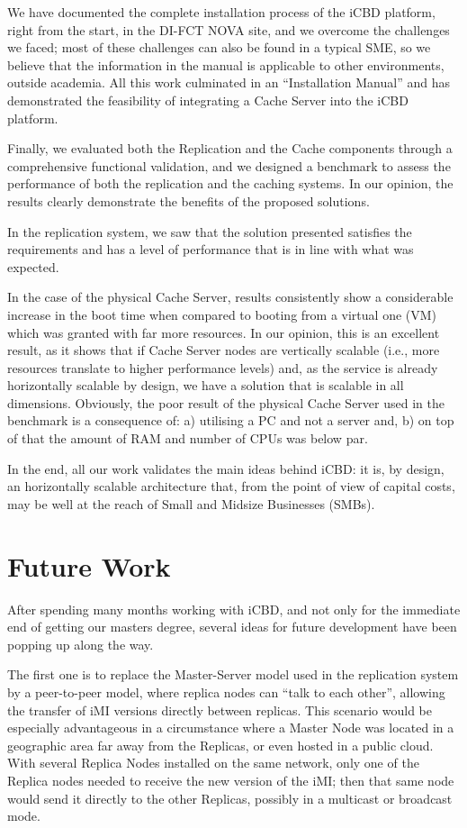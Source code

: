 We have documented the complete installation process of the iCBD platform, right from the start, in the DI-FCT NOVA site, and we overcome the challenges we faced; most of these challenges can also be found in a typical SME, so we believe that the information in the manual is applicable to other environments, outside academia. All this work culminated in an “Installation Manual” and has demonstrated the feasibility of integrating a Cache Server into the iCBD platform.

Finally, we evaluated both the Replication and the Cache components through a comprehensive functional validation, and we designed a benchmark to assess the performance of both the replication and the caching systems. In our opinion, the results clearly demonstrate the benefits of the proposed solutions.

In the replication system, we saw that the solution presented satisfies the requirements and has a level of performance that is in line with what was expected.

In the case of the physical Cache Server, results consistently show a considerable increase in the boot time when compared to booting from a virtual one (VM) which was granted with far more resources. In our opinion, this is an excellent result, as it shows that if Cache Server nodes are vertically scalable (i.e., more resources translate to higher performance levels) and, as the service is already horizontally scalable by design, we have a solution that is scalable in all dimensions. Obviously, the poor result of the physical Cache Server used in the benchmark is a consequence of: a) utilising a PC and not a server and, b) on top of that the amount of RAM and number of CPUs was below par.

In the end, all our work validates the main ideas behind iCBD: it is, by design, an horizontally scalable architecture that, from the point of view of capital costs, may be well at the reach of Small and Midsize Businesses (SMBs). 

\section{Future Work}
\label{sec:con_future_work}

After spending many months working with iCBD, and not only for the immediate end of getting our masters degree, several ideas for future development have been popping up along the way.

The first one is to replace the Master-Server model used in the replication system by a peer-to-peer model, where replica nodes can “talk to each other”, allowing the transfer of iMI versions directly between replicas. This scenario would be especially advantageous in a circumstance where a Master Node was located in a geographic area far away from the Replicas, or even hosted in a public cloud. With several Replica Nodes installed on the same network, only one of the Replica nodes needed to receive the new version of the iMI; then that same node would send it directly to the other Replicas, possibly in a multicast or broadcast mode.

